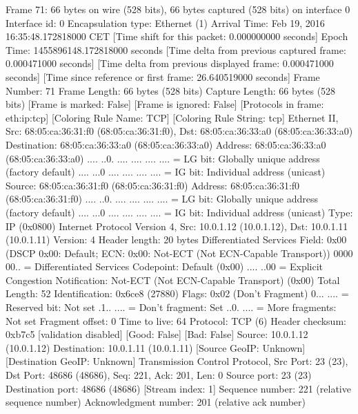 Frame 71: 66 bytes on wire (528 bits), 66 bytes captured (528 bits) on interface 0
    Interface id: 0
    Encapsulation type: Ethernet (1)
    Arrival Time: Feb 19, 2016 16:35:48.172818000 CET
    [Time shift for this packet: 0.000000000 seconds]
    Epoch Time: 1455896148.172818000 seconds
    [Time delta from previous captured frame: 0.000471000 seconds]
    [Time delta from previous displayed frame: 0.000471000 seconds]
    [Time since reference or first frame: 26.640519000 seconds]
    Frame Number: 71
    Frame Length: 66 bytes (528 bits)
    Capture Length: 66 bytes (528 bits)
    [Frame is marked: False]
    [Frame is ignored: False]
    [Protocols in frame: eth:ip:tcp]
    [Coloring Rule Name: TCP]
    [Coloring Rule String: tcp]
Ethernet II, Src: 68:05:ca:36:31:f0 (68:05:ca:36:31:f0), Dst: 68:05:ca:36:33:a0 (68:05:ca:36:33:a0)
    Destination: 68:05:ca:36:33:a0 (68:05:ca:36:33:a0)
        Address: 68:05:ca:36:33:a0 (68:05:ca:36:33:a0)
        .... ..0. .... .... .... .... = LG bit: Globally unique address (factory default)
        .... ...0 .... .... .... .... = IG bit: Individual address (unicast)
    Source: 68:05:ca:36:31:f0 (68:05:ca:36:31:f0)
        Address: 68:05:ca:36:31:f0 (68:05:ca:36:31:f0)
        .... ..0. .... .... .... .... = LG bit: Globally unique address (factory default)
        .... ...0 .... .... .... .... = IG bit: Individual address (unicast)
    Type: IP (0x0800)
Internet Protocol Version 4, Src: 10.0.1.12 (10.0.1.12), Dst: 10.0.1.11 (10.0.1.11)
    Version: 4
    Header length: 20 bytes
    Differentiated Services Field: 0x00 (DSCP 0x00: Default; ECN: 0x00: Not-ECT (Not ECN-Capable Transport))
        0000 00.. = Differentiated Services Codepoint: Default (0x00)
        .... ..00 = Explicit Congestion Notification: Not-ECT (Not ECN-Capable Transport) (0x00)
    Total Length: 52
    Identification: 0x6ce8 (27880)
    Flags: 0x02 (Don't Fragment)
        0... .... = Reserved bit: Not set
        .1.. .... = Don't fragment: Set
        ..0. .... = More fragments: Not set
    Fragment offset: 0
    Time to live: 64
    Protocol: TCP (6)
    Header checksum: 0xb7c5 [validation disabled]
        [Good: False]
        [Bad: False]
    Source: 10.0.1.12 (10.0.1.12)
    Destination: 10.0.1.11 (10.0.1.11)
    [Source GeoIP: Unknown]
    [Destination GeoIP: Unknown]
Transmission Control Protocol, Src Port: 23 (23), Dst Port: 48686 (48686), Seq: 221, Ack: 201, Len: 0
    Source port: 23 (23)
    Destination port: 48686 (48686)
    [Stream index: 1]
    Sequence number: 221    (relative sequence number)
    Acknowledgment number: 201    (relative ack number)
